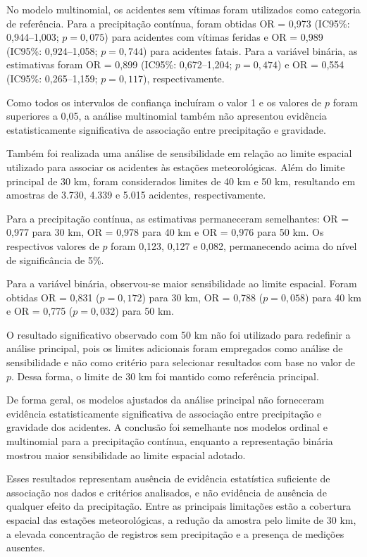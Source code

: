 \documentclass[12pt]{article}
\begin{document}
No modelo multinomial, os acidentes sem vítimas foram utilizados como
categoria de referência. Para a precipitação contínua, foram obtidas
OR = 0,973 (IC95\%: 0,944--1,003; $p = 0,075$) para acidentes com vítimas
feridas e OR = 0,989 (IC95\%: 0,924--1,058; $p = 0,744$) para acidentes
fatais. Para a variável binária, as estimativas foram OR = 0,899
(IC95\%: 0,672--1,204; $p = 0,474$) e OR = 0,554
(IC95\%: 0,265--1,159; $p = 0,117$), respectivamente.

Como todos os intervalos de confiança incluíram o valor 1 e os valores de
$p$ foram superiores a 0,05, a análise multinomial também não apresentou
evidência estatisticamente significativa de associação entre precipitação
e gravidade.

Também foi realizada uma análise de sensibilidade em relação ao limite
espacial utilizado para associar os acidentes às estações meteorológicas.
Além do limite principal de 30 km, foram considerados limites de 40 km e
50 km, resultando em amostras de 3.730, 4.339 e 5.015 acidentes,
respectivamente.

Para a precipitação contínua, as estimativas permaneceram semelhantes:
OR = 0,977 para 30 km, OR = 0,978 para 40 km e OR = 0,976 para 50 km.
Os respectivos valores de $p$ foram 0,123, 0,127 e 0,082, permanecendo
acima do nível de significância de 5\%.

Para a variável binária, observou-se maior sensibilidade ao limite espacial.
Foram obtidas OR = 0,831 ($p = 0,172$) para 30 km,
OR = 0,788 ($p = 0,058$) para 40 km e
OR = 0,775 ($p = 0,032$) para 50 km.

O resultado significativo observado com 50 km não foi utilizado para
redefinir a análise principal, pois os limites adicionais foram empregados
como análise de sensibilidade e não como critério para selecionar resultados
com base no valor de $p$. Dessa forma, o limite de 30 km foi mantido como
referência principal.

De forma geral, os modelos ajustados da análise principal não forneceram
evidência estatisticamente significativa de associação entre precipitação
e gravidade dos acidentes. A conclusão foi semelhante nos modelos ordinal
e multinomial para a precipitação contínua, enquanto a representação binária
mostrou maior sensibilidade ao limite espacial adotado.

Esses resultados representam ausência de evidência estatística suficiente
de associação nos dados e critérios analisados, e não evidência de ausência
de qualquer efeito da precipitação. Entre as principais limitações estão a
cobertura espacial das estações meteorológicas, a redução da amostra pelo
limite de 30 km, a elevada concentração de registros sem precipitação e a
presença de medições ausentes.
\end{document}
